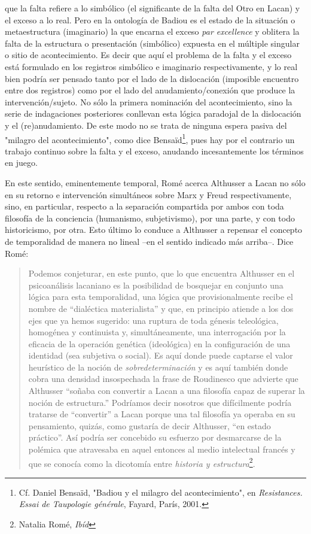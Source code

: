 \documentclass{book}
\begin{document}
que la falta refiere a lo simbólico (el significante de la falta del
Otro en Lacan) y el exceso a lo real. Pero en la ontología de Badiou es
el estado de la situación o metaestructura (imaginario) la que encarna
el exceso \emph{par excellence} y oblitera la falta de la estructura o
presentación (simbólico) expuesta en el múltiple singular o sitio de
acontecimiento. Es decir que aquí el problema de la falta y el exceso
está formulado en los registros simbólico e imaginario respectivamente,
y lo real bien podría ser pensado tanto por el lado de la dislocación
(imposible encuentro entre dos registros) como por el lado del
anudamiento/conexión que produce la intervención/sujeto. No sólo la
primera nominación del acontecimiento, sino la serie de indagaciones
posteriores conllevan esta lógica paradojal de la dislocación y el
(re)anudamiento. De este modo no se trata de ninguna espera pasiva del
"milagro del acontecimiento", como dice Bensaïd\footnote{Cf. Daniel
  Bensaïd, "Badiou y el milagro del acontecimiento", en
  \emph{Resistances. Essai de Taupologie générale}, Fayard, París, 2001.},
pues hay por el contrario un trabajo continuo sobre la falta y el
exceso, anudando incesantemente los términos en juego.

En este sentido, eminentemente temporal, Romé acerca Althusser a Lacan
no sólo en su retorno e intervención simultáneos sobre Marx y Freud
respectivamente, sino, en particular, respecto a la separación
compartida por ambos con toda filosofía de la conciencia (humanismo,
subjetivismo), por una parte, y con todo historicismo, por otra. Esto
último lo conduce a Althusser a repensar el concepto de temporalidad de
manera no lineal --en el sentido indicado más arriba--. Dice Romé:

\begin{quote}
Podemos conjeturar, en este punto, que lo que encuentra Althusser en el
psicoanálisis lacaniano es la posibilidad de bosquejar en conjunto una
lógica para esta temporalidad, una lógica que provisionalmente recibe el
nombre de ``dialéctica materialista'' y que, en principio atiende a los
dos ejes que ya hemos sugerido: una ruptura de toda génesis teleológica,
homogénea y continuista y, simultáneamente, una interrogación por la
eficacia de la operación genética (ideológica) en la configuración de
una identidad (sea subjetiva o social). Es aquí donde puede captarse el
valor heurístico de la noción de \emph{sobredeterminación} y es aquí
también donde cobra una densidad insospechada la frase de Roudinesco que
advierte que Althusser ``soñaba con convertir a Lacan a una filosofía
capaz de superar la noción de estructura.'' Podríamos decir nosotros que
difícilmente podría tratarse de ``convertir'' a Lacan porque una tal
filosofía ya operaba en su pensamiento, quizás, como gustaría de decir
Althusser, ``en estado práctico''. Así podría ser concebido su esfuerzo
por desmarcarse de la polémica que atravesaba en aquel entonces al medio
intelectual francés y que se conocía como la dicotomía entre
\emph{historia y estructura}\footnote{Natalia Romé, \emph{Ibíd}}.
\end{quote}
\end{document}
